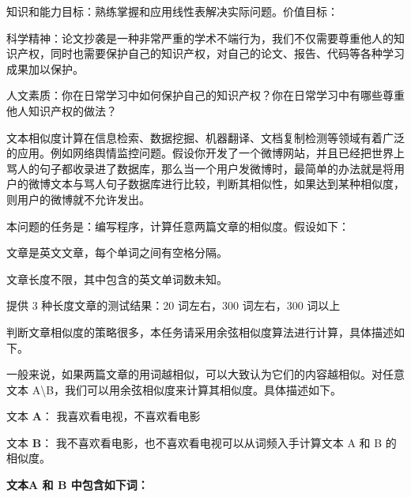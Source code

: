 \clearpage
{}
\noindent\hspace*{2em}知识和能力目标：熟练掌握和应用线性表解决实际问题。价值目标：\par
\noindent\hspace*{2em}科学精神：论文抄袭是一种非常严重的学术不端行为，我们不仅需要尊重他人的知识产权，同时也需要保护自己的知识产权，对自己的论文、报告、代码等各种学习成果加以保护。\par
\noindent\hspace*{2em}人文素质：你在日常学习中如何保护自己的知识产权？你在日常学习中有哪些尊重他人知识产权的做法？\par
{}
\noindent\hspace*{2em}文本相似度计算在信息检索、数据挖掘、机器翻译、文档复制检测等领域有着广泛的应用。例如网络舆情监控问题。假设你开发了一个微博网站，并且已经把世界上骂人的句子都收录进了数据库，那么当一个用户发微博时，最简单的办法就是将用户的微博文本与骂人句子数据库进行比较，判断其相似性，如果达到某种相似度，则用户的微博就不允许发出。\par
\noindent\hspace*{2em}本问题的任务是：编写程序，计算任意两篇文章的相似度。假设如下：\par
\noindent\hspace*{2em}文章是英文文章，每个单词之间有空格分隔。\par
\noindent\hspace*{2em}文章长度不限，其中包含的英文单词数未知。\par
\noindent\hspace*{2em}提供 3 种长度文章的测试结果：20 词左右，300 词左右，300 词以上\par
{}
\noindent\hspace*{2em}判断文章相似度的策略很多，本任务请采用余弦相似度算法进行计算，具体描述如下。\par
\noindent\hspace*{2em}一般来说，如果两篇文章的用词越相似，可以大致认为它们的内容越相似。对任意文本 A\textbackslash{}B，我们可以用余弦相似度来计算其相似度。具体描述如下。\par
\noindent\hspace*{2em}文本 \textbf{A}： 我喜欢看电视，不喜欢看电影\par
\noindent\hspace*{2em}文本 \textbf{B}： 我不喜欢看电影，也不喜欢看电视可以从词频入手计算文本 A 和 B 的相似度。\par
\noindent\textbf{文本A 和 B 中包含如下词：}\par

